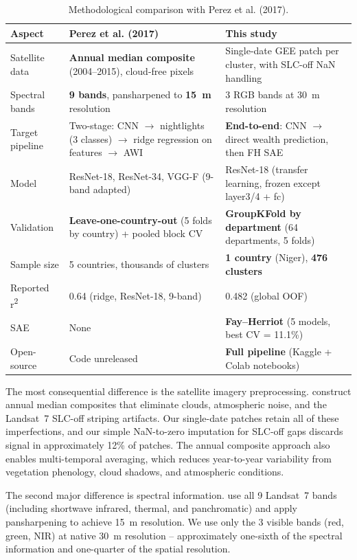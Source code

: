 \documentclass[11pt,a4paper]{article}
\begin{document}
\begin{table}[ht]
\centering
\caption{Methodological comparison with Perez et al. (2017).}
\label{tab:perez_comparison}
\begin{tabular}{lp{6cm}p{6cm}}
\toprule
Aspect & Perez et al. (2017) & This study \\
\midrule
Satellite data & \textbf{Annual median composite} (2004--2015), cloud-free pixels & Single-date GEE patch per cluster, with SLC-off NaN handling \\
\rowcolor{gray!15}
Spectral bands & \textbf{9 bands}, pansharpened to \textbf{15~m} resolution & 3 RGB bands at 30~m resolution \\
Target pipeline & Two-stage: CNN $\to$ nightlights (3 classes) $\to$ ridge regression on features $\to$ AWI & \textbf{End-to-end}: CNN $\to$ direct wealth prediction, then FH SAE \\
\rowcolor{gray!15}
Model & ResNet-18, ResNet-34, VGG-F (9-band adapted) & ResNet-18 (transfer learning, frozen except layer3/4 + fc) \\
Validation & \textbf{Leave-one-country-out} (5 folds by country) + pooled block CV & \textbf{GroupKFold by department} (64 departments, 5 folds) \\
\rowcolor{gray!15}
Sample size & 5 countries, thousands of clusters & \textbf{1 country} (Niger), \textbf{476 clusters} \\
Reported r\textsuperscript{2} & 0.64 (ridge, ResNet-18, 9-band) & 0.482 (global OOF) \\
\rowcolor{gray!15}
SAE & None & \textbf{Fay--Herriot} (5 models, best CV = 11.1\%) \\
Open-source & Code unreleased & \textbf{Full pipeline} (Kaggle + Colab notebooks) \\
\bottomrule
\end{tabular}
\end{table}

The most consequential difference is the satellite imagery preprocessing. \citet{perez2017} construct annual median composites that eliminate clouds, atmospheric noise, and the Landsat~7 SLC-off striping artifacts. Our single-date patches retain all of these imperfections, and our simple NaN-to-zero imputation for SLC-off gaps discards signal in approximately 12\% of patches. The annual composite approach also enables multi-temporal averaging, which reduces year-to-year variability from vegetation phenology, cloud shadows, and atmospheric conditions.

The second major difference is spectral information. \citet{perez2017} use all 9 Landsat~7 bands (including shortwave infrared, thermal, and panchromatic) and apply pansharpening to achieve 15~m resolution. We use only the 3 visible bands (red, green, NIR) at native 30~m resolution -- approximately one-sixth of the spectral information and one-quarter of the spatial resolution.
\end{document}
